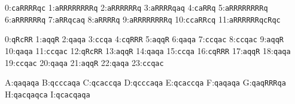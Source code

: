 \begin{description}[leftmargin=1.2em,itemsep=2pt,font=\normalfont\small]
\item[Fibonacci, $k \bmod 12$:] 0:\texttt{caRRRRqc} 1:\texttt{aRRRRRRRRq} 2:\texttt{aRRRRRRq} 3:\texttt{aRRRRqaq} 4:\texttt{caRRq} 5:\texttt{aRRRRRRRRq} 6:\texttt{aRRRRRRq} 7:\texttt{aRRqcaq} 8:\texttt{aRRRRq} 9:\texttt{aRRRRRRRRq} 10:\texttt{ccaRRcq} 11:\texttt{aRRRRRRqcRqc}
\item[Squares direct, $n \bmod 24$:] 0:\texttt{qRcRR} 1:\texttt{aqqR} 2:\texttt{qaqa} 3:\texttt{ccqa} 4:\texttt{cqRRR} 5:\texttt{aqqR} 6:\texttt{qaqa} 7:\texttt{ccqac} 8:\texttt{ccqac} 9:\texttt{aqqR} 10:\texttt{qaqa} 11:\texttt{ccqac} 12:\texttt{qRcRR} 13:\texttt{aqqR} 14:\texttt{qaqa} 15:\texttt{ccqa} 16:\texttt{cqRRR} 17:\texttt{aqqR} 18:\texttt{qaqa} 19:\texttt{ccqac} 20:\texttt{qaqa} 21:\texttt{aqqR} 22:\texttt{qaqa} 23:\texttt{ccqac}
\item[Squares wrapper, U2-001 class:] A:\texttt{qaqaqa} B:\texttt{qcccaqa} C:\texttt{qcaccqa} D:\texttt{qcccaqa} E:\texttt{qcaccqa} F:\texttt{qaqaqa} G:\texttt{qaqRRRqa} H:\texttt{qacqaqca} I:\texttt{qcacqaqa}
\end{description}
